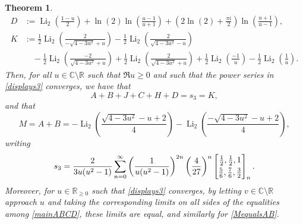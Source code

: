 \documentclass[12pt]{article}
\newtheorem{theorem}{Theorem}
\begin{document}
{\begin{theorem}
\begin{align*}
 D & := \operatorname{Li}_2 \left( \frac{1 - u}{2} \right) 
 + \ln(2) \ln \left( \frac{u - 1}{u + 1} \right) + \left( 2 \ln(2) + \frac{\pi i}{2} \right) \ln \left( \frac{u + 
 1}{u - 1} \right), \\ 
 K & := \frac{1}{2} \operatorname{Li}_2 \left( \frac{2}{- \sqrt{4 - 3 u^2} + u} \right) - 
 \frac{1}{2} \operatorname{Li}_2 \left( \frac{2}{\sqrt{4 - 3 u^2} - u} \right) \\ 
 &\quad - \frac{1}{2} \operatorname{Li}_2 \left( \frac{-2}{\sqrt{4 - 3 u^2} + u} \right) + 
 \frac{1}{2} \operatorname{Li}_2 \left( \frac{2}{\sqrt{4 - 3 u^2} + u} \right) + 
 \frac{1}{2} \operatorname{Li}_2 \left( \frac{-1}{u} \right) - 
 \frac{1}{2} \operatorname{Li}_2 \left( \frac{1}{u} \right). 
\end{align*} 
 Then, for all $u \in \mathbb{C} \setminus \mathbb{R}$ such that $\Re u \geq 0$ and such that the power series 
 in \eqref{displays3} converges, we have that 
\begin{equation}\label{mainABCD}
 A + B + J + C + H + D = s_3 = K, 
\end{equation}
 and that 
\begin{equation}\label{MequalsAB}
 M = A + B = 
 - \operatorname{Li}_{2}\left( \frac{\sqrt{4 - 3 u^2} - u + 2}{4} \right) 
 - \operatorname{Li}_{2}\left( \frac{-\sqrt{4 - 3 u^2} - u + 2}{4} \right), 
\end{equation}
 writing 
\begin{equation}\label{displays3}
 s_3 = \frac{2}{3u(u^2-1)} \sum_{n=0}^{\infty} \left( \frac{1}{u(u^2-1)} \right)^{2n} \left( \frac{4}{27} \right)^{n} 
 \left[ \begin{matrix} \frac{1}{2}, \frac{1}{2}, 1 
 \vspace{1mm} \\ 
 \frac{5}{6}, \frac{7}{6}, \frac{3}{2} \end{matrix} \right]_{n}. 
\end{equation}
 Moreover, for $u \in \mathbb{R}_{\geq 0}$ such that \eqref{displays3} converges, by letting $v \in \mathbb{C} \setminus \mathbb{R}$ 
 approach $u$ and taking the corresponding limits on all sides of the equalities among \eqref{mainABCD}, these limits are equal, 
 and similarly for \eqref{MequalsAB}. 
\end{theorem}

}
\end{document}
